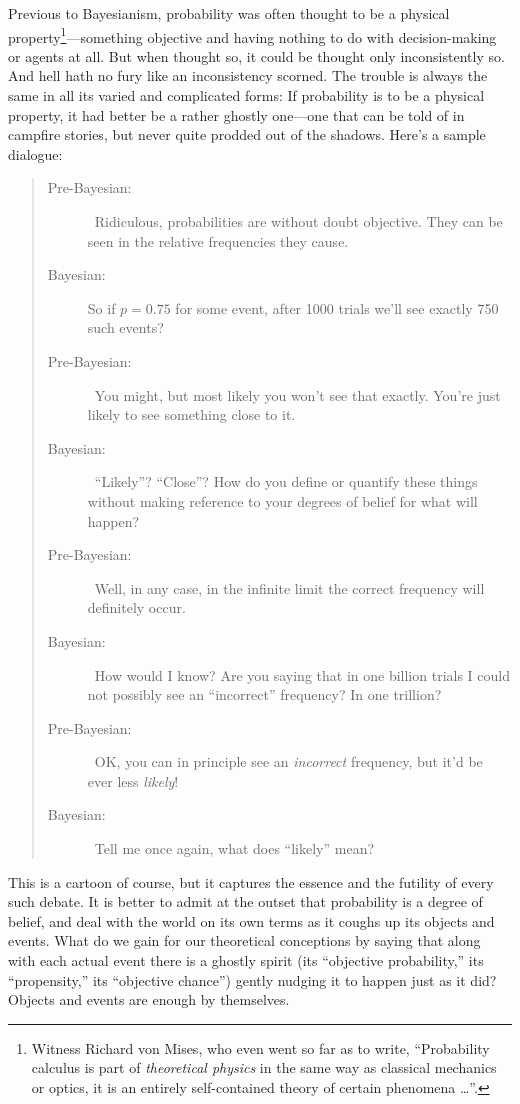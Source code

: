 \documentclass[aps,pra,superscriptaddress,10pt,tightenlines,twocolumn,nofootinbib]{revtex4}
\begin{document}
Previous to  Bayesianism, probability was often thought to be a physical property\footnote{Witness Richard von Mises, who even went so far as to write, ``Probability calculus is part of {\it theoretical physics\/} in the same way as classical mechanics or optics, it is an entirely self-contained theory of certain phenomena \ldots''\cite{Mises22}.}---something objective and having nothing to do with decision-making or agents at all.  But when thought so, it could be thought only inconsistently so.  And hell hath no fury like an inconsistency scorned.
The trouble is always the same in all its varied and complicated forms:  If probability is to be a physical property, it had better be a rather ghostly one---one that can be told of in campfire stories, but never quite prodded out of the shadows.  Here's a sample dialogue:
\begin{quote}
\begin{description}

\item[Pre-Bayesian:]  \ Ridiculous, probabilities are without doubt objective.  They can be seen in the relative frequencies they cause.
\item[Bayesian:]  So if $p=0.75$ for some event, after 1000 trials we'll see exactly 750 such events?
\item[Pre-Bayesian:]  \ You might, but most likely you won't see that exactly.  You're just likely to see something close to it.
\item[Bayesian:]  \ ``Likely''?  ``Close''?  How do you define or quantify these things without making reference to your degrees of belief for what will happen?
\item[Pre-Bayesian:]  \ Well, in any case, in the infinite limit the correct frequency will definitely occur.
\item[Bayesian:]  \ How would I know?  Are you saying that in one billion trials I could not possibly see an ``incorrect'' frequency?  In one trillion?
\item[Pre-Bayesian:]  \ OK, you can in principle see an {\it incorrect\/} frequency, but it'd be ever less {\it likely}!
\item[Bayesian:]  \ Tell me once again, what does ``likely'' mean?
\end{description}
\end{quote}
This is a cartoon of course, but it captures the essence and the futility of every such debate.  It is better to admit at the outset that probability is a degree of belief, and deal with the world on its own terms as it coughs up its objects and events.  What do we gain for our theoretical conceptions by saying that along with each actual event there is a ghostly spirit (its ``objective probability,'' its ``propensity,'' its ``objective chance'') gently nudging it to happen just as it did?  Objects and events are enough by themselves.
\end{document}
